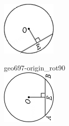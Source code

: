 \documentclass[12pt]{article}
\begin{document}
\begin{center}
\begin{minipage}{0.32\textwidth}
\includegraphics[width=0.95\linewidth]{out_rommath_origin/items/geo697-origin/assets/figure_rot30.png}
\end{minipage}
\hfill\begin{minipage}{0.32\textwidth}\centering
geo697-origin\_rot90\\
\includegraphics[width=0.95\linewidth]{out_rommath_origin/items/geo697-origin/assets/figure_rot90.png}

\end{minipage}
\end{center}
\end{document}
